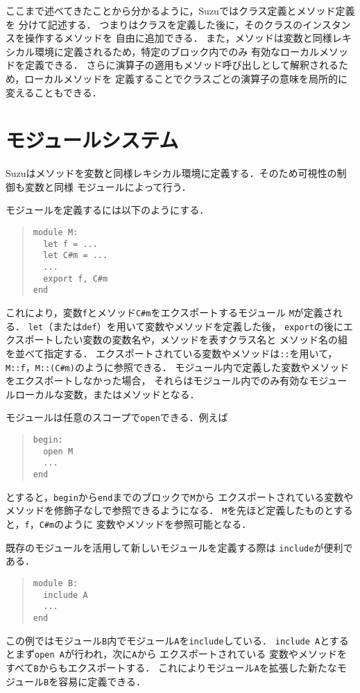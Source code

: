 \documentclass[a4paper,11pt,dvipdfmx]{jreport}
\begin{document}
ここまで述べてきたことから分かるように，Suzuではクラス定義とメソッド定義を
分けて記述する．
つまりはクラスを定義した後に，そのクラスのインスタンスを操作するメソッドを
自由に追加できる．
また，メソッドは変数と同様レキシカル環境に定義されるため，特定のブロック内でのみ
有効なローカルメソッドを定義できる．
さらに演算子の適用もメソッド呼び出しとして解釈されるため，ローカルメソッドを
定義することでクラスごとの演算子の意味を局所的に変えることもできる．

\section{モジュールシステム}

Suzuはメソッドを変数と同様レキシカル環境に定義する．そのため可視性の制御も変数と同様
モジュールによって行う．

モジュールを定義するには以下のようにする．
\begin{quote}
\begin{verbatim}
module M:
  let f = ...
  let C#m = ...
  ...
  export f, C#m
end
\end{verbatim}
\end{quote}
これにより，変数\verb|f|とメソッド\verb|C#m|をエクスポートするモジュール
\verb|M|が定義される．
\verb|let|（または\verb|def|）を用いて変数やメソッドを定義した後，
\verb|export|の後にエクスポートしたい変数の変数名や，メソッドを表すクラス名と
メソッド名の組を並べて指定する．
エクスポートされている変数やメソッドは\verb|::|を用いて，
\verb|M::f|，\verb|M::(C#m)|のように参照できる．
モジュール内で定義した変数やメソッドをエクスポートしなかった場合，
それらはモジュール内でのみ有効なモジュールローカルな変数，またはメソッドとなる．

モジュールは任意のスコープで\verb|open|できる．例えば
\begin{quote}
\begin{verbatim}
begin:
  open M
  ...
end
\end{verbatim}
\end{quote}
とすると，\verb|begin|から\verb|end|までのブロックで\verb|M|から
エクスポートされている変数やメソッドを修飾子なしで参照できるようになる．
\verb|M|を先ほど定義したものとすると，\verb|f|，\verb|C#m|のように
変数やメソッドを参照可能となる．

既存のモジュールを活用して新しいモジュールを定義する際は
\verb|include|が便利である．
\begin{quote}
\begin{verbatim}
module B:
  include A
  ...
end
\end{verbatim}
\end{quote}
この例ではモジュール\verb|B|内でモジュール\verb|A|を\verb|include|している．
\verb|include A|とするとまず\verb|open A|が行われ，次に\verb|A|から
エクスポートされている
変数やメソッドをすべて\verb|B|からもエクスポートする．
これによりモジュール\verb|A|を拡張した新たなモジュール\verb|B|を容易に定義できる．
\end{document}
